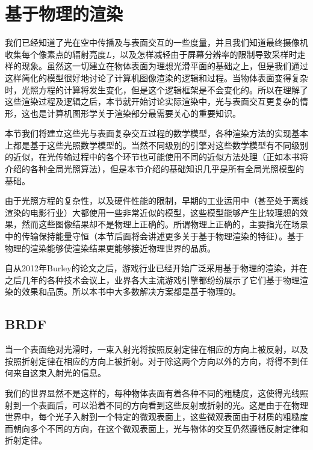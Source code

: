 \section{基于物理的渲染}
我们已经知道了光在空中传播及与表面交互的一些度量，并且我们知道最终摄像机收集每个像素点的辐射亮度$L$，以及怎样减轻由于屏幕分辨率的限制导致采样时走样的现象。虽然这一切建立在物体表面为理想光滑平面的基础之上，但是我们通过这样简化的模型很好地讨论了计算机图像渲染的逻辑和过程。当物体表面变得复杂时，光照方程的计算将发生变化，但是这个逻辑框架是不会变化的。所以在理解了这些渲染过程及逻辑之后，本节就开始讨论实际渲染中，光与表面交互更复杂的情形，这也是计算机图形学关于渲染部分最需要关心的重要知识。

本节我们将建立这些光与表面复杂交互过程的数学模型，各种渲染方法的实现基本上都是基于这些光照数学模型的。当然不同级别的引擎对这些数学模型有不同级别的近似，在光传输过程中的各个环节也可能使用不同的近似方法处理（正如本书将介绍的各种全局光照算法），但是本节介绍的基础知识几乎是所有全局光照模型的基础。

由于光照方程的复杂性，以及硬件性能的限制，早期的工业运用中（甚至处于离线渲染的电影行业）大都使用一些非常近似的模型，这些模型能够产生比较理想的效果，然而这些图像结果却不是物理上正确的。所谓物理上正确的，主要指光在场景中的传输保持能量守恒（本节后面将会讲述更多关于基于物理渲染的特征）。基于物理的渲染能够使渲染结果更能够接近物理世界的品质。

自从2012年Burley的论文\cite{a:PhysicallyBasedShadingatDisney}之后，游戏行业已经开始广泛采用基于物理的渲染，并在之后几年的各种技术会议上，业界各大主流游戏引擎都纷纷展示了它们基于物理渲染的效果和品质。所以本书中大多数解决方案都是基于物理的。







\subsection{BRDF}\label{sec:intro-BRDF}
当一个表面绝对光滑时，一束入射光将按照反射定律在相应的方向上被反射，以及按照折射定律在相应的方向上被折射。对于除这两个方向以外的方向，将得不到任何来自这束入射光的信息。

我们的世界显然不是这样的，每种物体表面有着各种不同的粗糙度，这使得光线照射到一个表面后，可以沿着不同的方向看到这些反射或折射的光。这是由于在物理世界中，每个光子入射到一个特定的微观表面上，这些微观表面由于材质的粗糙度而朝向多个不同的方向，在这个微观表面上，光与物体的交互仍然遵循反射定律和折射定律。

